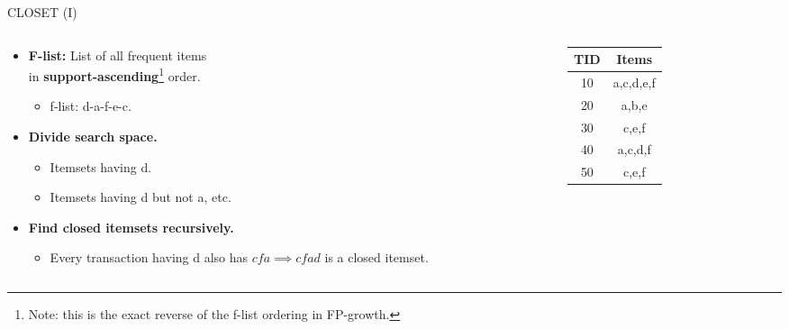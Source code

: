 \begin{frame}{CLOSET (I)}
	\begin{columns}[c]
		\begin{column}{0.6\textwidth}
			\begin{itemize}
				\item \textbf{F-list:} List of all frequent items \\ in
				      \textbf{support-ascending}\footnote{Note: this is the exact reverse of the f-list ordering in FP-growth.} order.
				      \begin{itemize}
					      \item f-list: d-a-f-e-c.
				      \end{itemize}
				\item \textbf{Divide search space.}
				      \begin{itemize}
					      \item Itemsets having d.
					      \item Itemsets having d but not a, etc.
				      \end{itemize}
				\item \textbf{Find closed itemsets recursively.}
				      \begin{itemize}
					      \item Every transaction having d also has $cfa \implies
						            cfad$ is a closed itemset.
				      \end{itemize}
			\end{itemize}
		\end{column}
		\begin{column}{0.25\textwidth}
			\begin{tabular}{|c|c|}
				\hline
				\textbf{TID} & \textbf{Items} \\\hline
				10           & a,c,d,e,f      \\\hline
				20           & a,b,e          \\\hline
				30           & c,e,f          \\\hline
				40           & a,c,d,f        \\\hline
				50           & c,e,f          \\\hline
			\end{tabular}
		\end{column}
	\end{columns}
\end{frame}

